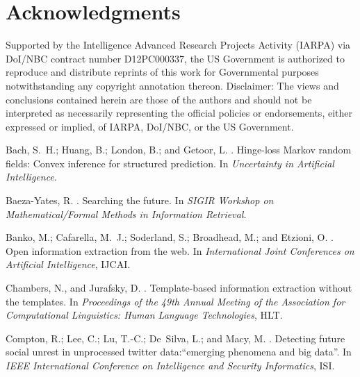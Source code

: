 \documentclass[letterpaper]{article}
\begin{document}
\section*{Acknowledgments}
Supported by the Intelligence Advanced Research Projects Activity (IARPA) via
DoI/NBC contract number D12PC000337, the US Government is authorized to
reproduce and distribute reprints of this work for Governmental purposes
notwithstanding any copyright annotation thereon.  Disclaimer: The views and
conclusions contained herein are those of the authors and should not be
interpreted as necessarily representing the official policies or endorsements,
either expressed or implied, of IARPA, DoI/NBC, or the US Government.

%
\begin{thebibliography}{}

Bach, S.~H.; Huang, B.; London, B.; and Getoor, L.
.
\newblock Hinge-loss {M}arkov random fields: Convex inference for structured
  prediction.
\newblock In {\em Uncertainty in Artificial Intelligence}.

Baeza-Yates, R.
.
\newblock Searching the future.
\newblock In {\em SIGIR Workshop on Mathematical/Formal Methods in Information
  Retrieval}.

Banko, M.; Cafarella, M.~J.; Soderland, S.; Broadhead, M.; and Etzioni, O.
.
\newblock Open information extraction from the web.
\newblock In {\em International Joint Conferences on Artificial Intelligence},
  IJCAI.

Chambers, N., and Jurafsky, D.
.
\newblock Template-based information extraction without the templates.
\newblock In {\em Proceedings of the 49th Annual Meeting of the Association for
  Computational Linguistics: Human Language Technologies}, HLT.

Compton, R.; Lee, C.; Lu, T.-C.; De~Silva, L.; and Macy, M.
.
\newblock Detecting future social unrest in unprocessed twitter
  data:“emerging phenomena and big data”.
\newblock In {\em IEEE International Conference on Intelligence and Security
  Informatics}, ISI.


\end{thebibliography}
\end{document}

